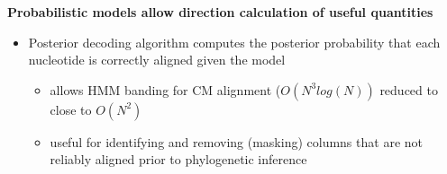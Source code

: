 \documentclass[landscape]{slides}
\begin{document}
\begin{slide}
\begin{center}
\textbf{Probabilistic models allow direction calculation of useful quantities}
\end{center}

\small
\begin{itemize}
  \item Posterior decoding algorithm computes the posterior
  probability that each nucleotide is correctly aligned given the
  model
  \begin{itemize}
    \item allows HMM banding for CM alignment ($O(N^3 log(N))$ reduced
    to close to $O(N^2)$
    \item useful for identifying and removing (masking) columns that
    are not reliably aligned prior to phylogenetic inference
  \end{itemize}
\end{itemize}


\vfill
\end{slide}
\end{document}
